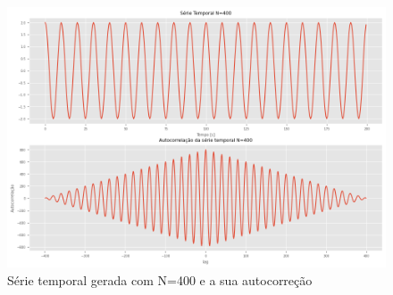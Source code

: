\documentclass[12pt,a4paper,portuguese]{article}
\begin{document}
\begin{figure}[H]
	\centering
	\includegraphics[width=1\linewidth]{lista3-5-400}
	\caption{Série temporal gerada com N=400 e a sua autocorreção }
	\label{fig:lista3-5-400}
\end{figure}
\end{document}
